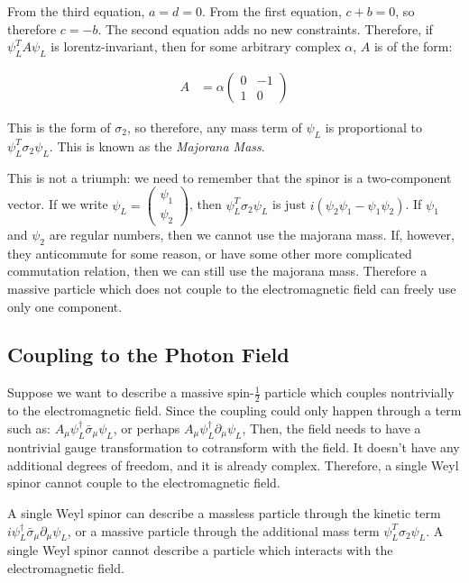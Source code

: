 \documentclass{article}
\begin{document}
From the third equation, $a = d = 0$.
From the first equation, $c + b = 0$, so therefore $c = -b$.
The second equation adds no new constraints.
Therefore, if $\psi_L^T A \psi_L$ is lorentz-invariant, then for some
	arbitrary complex $\alpha$, $A$ is of the form:

\begin{align}
A & = \alpha \left( \begin{matrix} 0 & -1 \\1 & 0 \end{matrix} \right)
\end{align}

This is the form of $\sigma_2$, so therefore, any mass term of $\psi_L$
	is proportional to $\psi_L^T \sigma_2 \psi_L$.
This is known as the \emph{Majorana Mass}.

This is not a triumph: we need to remember that the spinor
	is a two-component vector.
If we write $\psi_L = \left( \begin{matrix} \psi_1 \\ \psi_2 \end{matrix} \right)$,
	then $\psi_L^T \sigma_2 \psi_L$ is just $i(\psi_2 \psi_1 - \psi_1 \psi_2)$.
If $\psi_1$ and $\psi_2$ are regular numbers, then we cannot
	use the majorana mass.
If, however, they anticommute for some reason, or have some other
	more complicated commutation relation, then we can still use the
	majorana mass.
Therefore a massive particle which does not couple to the electromagnetic
	field can freely use only one component.

\subsection{Coupling to the Photon Field}

Suppose we want to describe a massive spin-$\frac12$ particle which	
	couples nontrivially to the electromagnetic field.
Since the coupling could only happen through a term such as:
$A_\mu \psi_L^\dagger \bar{\sigma}_\mu \psi_L$, or perhaps
	$A_\mu \psi_L^\dagger \partial_\mu \psi_L$,
Then, the field needs to have a nontrivial gauge transformation to cotransform
	with the field.
It doesn't have any additional degrees of freedom, and it is already
	complex.
Therefore, a single Weyl spinor cannot couple to the electromagnetic field.

A single Weyl spinor can describe a massless particle through the kinetic
	term $i \psi_L^\dagger \bar{\sigma}_\mu \partial_\mu \psi_L$, 
	or a massive particle through the additional mass term
	$\psi_L^T \sigma_2 \psi_L$.
A single Weyl spinor cannot describe a particle which interacts with
	the electromagnetic field.
\end{document}

